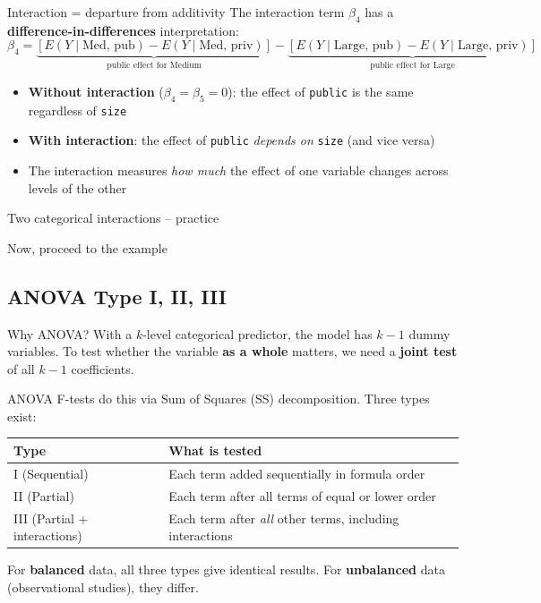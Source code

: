 \documentclass[10pt,ignorenonframetext,aspectratio=169]{beamer}
\begin{document}
\begin{frame}{Interaction = departure from additivity}
    The interaction term $\beta_4$ has a \textbf{difference-in-differences} interpretation:
    \[
    \beta_4 = \underbrace{\left[E(Y \mid \text{Med, pub}) - E(Y \mid \text{Med, priv})\right]}_{\text{public effect for Medium}} - \underbrace{\left[E(Y \mid \text{Large, pub}) - E(Y \mid \text{Large, priv})\right]}_{\text{public effect for Large}}
    \]

    \medskip
    \begin{itemize}
        \item \textbf{Without interaction} ($\beta_4 = \beta_5 = 0$): the effect of \texttt{public} is the same regardless of \texttt{size}
        \item \textbf{With interaction}: the effect of \texttt{public} \emph{depends on} \texttt{size} (and vice versa)
        \item The interaction measures \emph{how much} the effect of one variable changes across levels of the other
    \end{itemize}
\end{frame}

\begin{frame}{Two categorical interactions -- practice}
\begin{center}
Now, proceed to the example
\end{center}
\end{frame}


\subsection{ANOVA Type I, II, III}

\begin{frame}{Why ANOVA?}
    With a $k$-level categorical predictor, the model has $k - 1$ dummy variables. To test whether the variable \textbf{as a whole} matters, we need a \textbf{joint test} of all $k - 1$ coefficients.

    \medskip
    ANOVA F-tests do this via Sum of Squares (SS) decomposition. Three types exist:

    \begin{table}[h]\centering\small
    \begin{tabular}{lp{7cm}}
    \hline
    \textbf{Type} & \textbf{What is tested} \\
    \hline
    I (Sequential) & Each term added sequentially in formula order \\
    II (Partial) & Each term after all terms of equal or lower order \\
    III (Partial + interactions) & Each term after \emph{all} other terms, including interactions \\
    \hline
    \end{tabular}
    \end{table}

    \medskip
    For \textbf{balanced} data, all three types give identical results. For \textbf{unbalanced} data (observational studies), they differ.
\end{frame}
\end{document}

